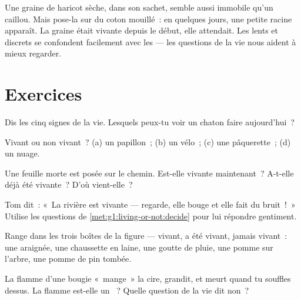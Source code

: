 \begin{remark}\label{rem:g1:living-or-not:seed}
Une graine de haricot sèche, dans son sachet, semble aussi immobile
qu'un caillou. Mais pose-la sur du coton mouillé~: en quelques
jours, une petite racine apparaît. La graine était vivante depuis le
début, elle attendait. Les  lents et discrets se
confondent facilement avec les  --- les questions
de la vie nous aident à mieux regarder.
\end{remark}

\section{Exercices}

\begin{exercise}[$\star$]\label{exo:g1:living-or-not:1}
Dis les cinq signes de la vie. Lesquels peux-tu voir un chaton faire
aujourd'hui~?
\end{exercise}

\begin{exercise}[$\star$]\label{exo:g1:living-or-not:2}
Vivant ou non vivant~? (a) un papillon~; (b) un vélo~; (c) une
pâquerette~; (d) un nuage.
\end{exercise}

\begin{exercise}[$\star$]\label{exo:g1:living-or-not:3}
Une feuille morte est posée sur le chemin. Est-elle vivante
maintenant~? A-t-elle déjà été vivante~? D'où vient-elle~?
\end{exercise}

\begin{exercise}[$\star$]\label{exo:g1:living-or-not:4}
Tom dit~: «~La rivière est vivante --- regarde, elle bouge et elle
fait du bruit~!~» Utilise les questions de
\cref{met:g1:living-or-not:decide} pour lui répondre gentiment.
\end{exercise}

\begin{exercise}[$\star$]\label{exo:g1:living-or-not:5}
Range dans les trois boîtes de la figure --- vivant, a été vivant,
jamais vivant~: une araignée, une chaussette en laine, une goutte de
pluie, une pomme sur l'arbre, une pomme de pin tombée.
\end{exercise}

\begin{exercise}[$\star$]\label{exo:g1:living-or-not:6}
La flamme d'une bougie «~mange~» la cire, grandit, et meurt quand tu
souffles dessus. La flamme est-elle un ~? Quelle question
de la vie dit non~?
\end{exercise}


